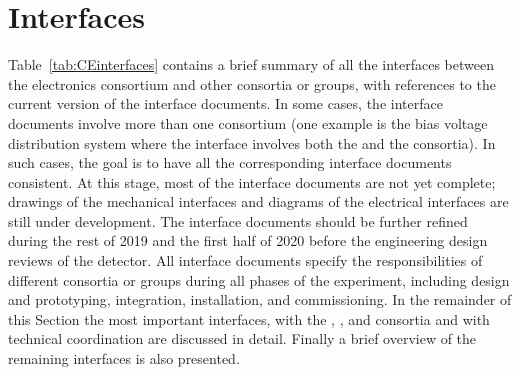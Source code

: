 \section{Interfaces}
\label{sec:fdsp-tpcelec-interfaces}

Table~\ref{tab:CEinterfaces} contains a brief summary of all the interfaces
between the  electronics consortium and other consortia or groups,
with references to the current version of the interface documents. 
In some cases, the interface documents involve more than one 
consortium (one example is the bias voltage distribution system where
the interface involves both the  and the  consortia).
In such cases, the goal is to have all the corresponding interface documents 
consistent. At this stage, most of the interface documents are
not yet complete; drawings of the mechanical interfaces and diagrams
of the electrical interfaces are still under development. The interface 
documents should be further refined during the rest of 2019 and the 
first half of 2020 before the engineering design
reviews of the detector. All interface documents specify the responsibilities
of different consortia or groups during all phases of the experiment,
including design and prototyping, integration, installation,
and commissioning. In the remainder of this Section the most
important interfaces, with the , , and 
consortia and with technical coordination are discussed in detail.
Finally a brief overview of the remaining interfaces is also presented.



